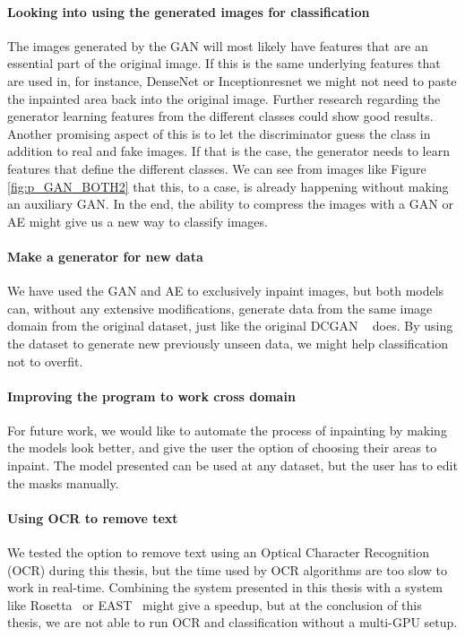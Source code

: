 \paragraph{Looking into using the generated images for classification}
The images generated by the GAN will most likely have features that are an essential part of the original image. If this is the same underlying features that are used in, for instance, DenseNet or Inceptionresnet we might not need to paste the inpainted area back into the original image.
Further research regarding the generator learning features from the different classes could show good results.
Another promising aspect of this is to let the discriminator guess the class in addition to real and fake images. If that is the case, the generator needs to learn features that define the different classes. We can see from images like Figure \ref{fig:p_GAN_BOTH2} that this, to a case, is already happening without making an auxiliary GAN.
In the end, the ability to compress the images with a GAN or AE might give us a new way to classify images.


\paragraph{Make a generator for new data}
We have used the GAN and AE to exclusively inpaint images, but both models can, without any extensive modifications,  generate data from the same image domain from the original dataset, just like the original DCGAN ~\cite{DBLP:journals/corr/RadfordMC15} does.  
By using the dataset to generate new previously unseen data, we might help classification not to overfit.

\paragraph{Improving the program to work cross domain}
For future work, we would like to automate the process of inpainting by making the models look better, and give the user the option of choosing their areas to inpaint. The model presented can be used at any dataset, but the user has to edit the masks manually. 

\paragraph{Using OCR to remove text}
We tested the option to remove text using an Optical Character Recognition (OCR) during this thesis, but the time used by OCR algorithms are too slow to work in real-time. Combining the system presented in this thesis with a system like Rosetta~\cite{borisyuk2018rosetta} or EAST~\cite{DBLP:journals/corr/ZhouYWWZHL17} might give a speedup, but at the conclusion of this thesis, we are not able to run OCR and classification without a multi-GPU setup.


